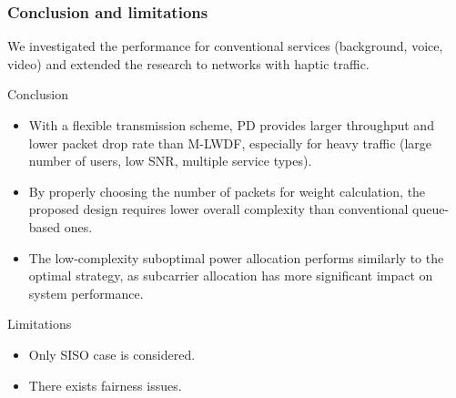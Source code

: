 \documentclass{beamer}
\begin{document}
\begin{frame}
\frametitle{Conclusion and limitations}

We investigated the performance for conventional services (background, voice, video) and extended the research to networks with haptic traffic.

\begin{block}{Conclusion}

\begin{itemize}
  \item With a flexible transmission scheme, PD provides larger throughput and lower packet drop rate than M-LWDF, especially for heavy traffic (large number of users, low SNR, multiple service types).
  \item By properly choosing the number of packets for weight calculation, the proposed design requires lower overall complexity than conventional queue-based ones.
  \item The low-complexity suboptimal power allocation performs similarly to the optimal strategy, as subcarrier allocation has more significant impact on system performance.
\end{itemize}
\end{block}

\begin{block}{Limitations}
\begin{itemize}
  \item Only SISO case is considered.
  \item There exists fairness issues.
\end{itemize}
\end{block}

\end{frame}
\end{document}
